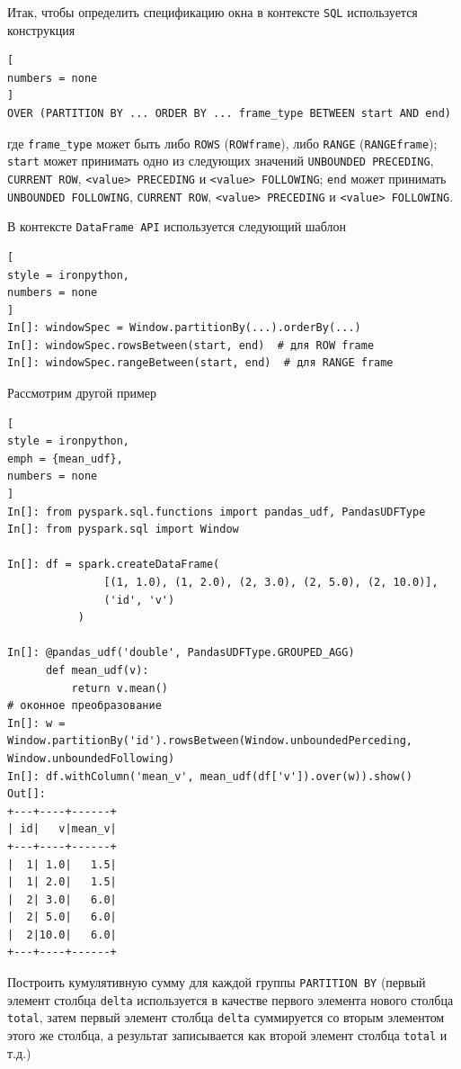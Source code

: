 \documentclass[%
	11pt,
	a4paper,
	utf8,
		]{article}
\begin{document}
Итак, чтобы определить спецификацию окна в контексте \texttt{SQL} используется конструкция

\begin{lstlisting}[
numbers = none
]
OVER (PARTITION BY ... ORDER BY ... frame_type BETWEEN start AND end)
\end{lstlisting}
где
\texttt{frame\_type} может быть либо \texttt{ROWS} (\texttt{ROWframe}), либо \texttt{RANGE} (\texttt{RANGEframe}); \texttt{start} может принимать одно из следующих значений \texttt{UNBOUNDED PRECEDING}, \texttt{CURRENT ROW}, \texttt{<value> PRECEDING} и \texttt{<value> FOLLOWING}; \texttt{end} может принимать \texttt{UNBOUNDED FOLLOWING}, \texttt{CURRENT ROW}, \texttt{<value> PRECEDING} и \texttt{<value> FOLLOWING}.

В контексте \texttt{DataFrame API} используется следующий шаблон

\begin{lstlisting}[
style = ironpython,
numbers = none
]
In[]: windowSpec = Window.partitionBy(...).orderBy(...)
In[]: windowSpec.rowsBetween(start, end)  # для ROW frame
In[]: windowSpec.rangeBetween(start, end)  # для RANGE frame
\end{lstlisting}

Рассмотрим другой пример

\begin{lstlisting}[
style = ironpython,
emph = {mean_udf},
numbers = none
]
In[]: from pyspark.sql.functions import pandas_udf, PandasUDFType
In[]: from pyspark.sql import Window

In[]: df = spark.createDataFrame(
               [(1, 1.0), (1, 2.0), (2, 3.0), (2, 5.0), (2, 10.0)],
               ('id', 'v')
           )
           
In[]: @pandas_udf('double', PandasUDFType.GROUPED_AGG)
      def mean_udf(v):
          return v.mean()
# оконное преобразование        
In[]: w = Window.partitionBy('id').rowsBetween(Window.unboundedPerceding, Window.unboundedFollowing)
In[]: df.withColumn('mean_v', mean_udf(df['v']).over(w)).show()
Out[]:
+---+----+------+
| id|   v|mean_v|
+---+----+------+
|  1| 1.0|   1.5|
|  1| 2.0|   1.5|
|  2| 3.0|   6.0|
|  2| 5.0|   6.0|
|  2|10.0|   6.0|
+---+----+------+
\end{lstlisting}

Построить кумулятивную сумму для каждой группы \texttt{PARTITION BY} (первый элемент столбца \texttt{delta} используется в качестве первого элемента нового столбца \texttt{total}, затем первый элемент столбца \texttt{delta} суммируется со вторым элементом этого же столбца, а результат записывается как второй элемент столбца \texttt{total} и т.д.)
\end{document}
